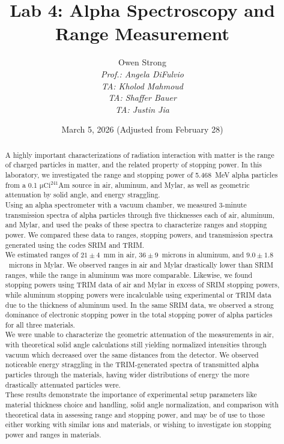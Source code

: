 \documentclass[12pt]{article}
\title{Lab 4: Alpha Spectroscopy and Range Measurement}
\author{Owen Strong \\
\itshape Prof.: Angela DiFulvio\\
\itshape TA: Kholod Mahmoud \\
\itshape TA: Shaffer Bauer \\
\itshape TA: Justin Jia \\
}
\date{March 5, 2026 (Adjusted from February 28)}
\newcommand{\micCi}{\xspace$\mathrm{\mu Ci}$\xspace}
\newcommand{\AmSrc}{\xspace$^{241}$Am\xspace}
\begin{document}
\maketitle
\pagebreak
{\hypersetup{linkcolor=black}\tableofcontents}
\begin{abstract}
A highly important characterizations of radiation interaction with matter is the range of charged particles in matter, and the related property of stopping power.
In this laboratory, we investigated the range and stopping power of 5.468~MeV alpha particles from a 0.1 \micCi \AmSrc source in air, aluminum, and Mylar, as well as geometric attenuation by solid angle, and energy straggling.\\

Using an alpha spectrometer with a vacuum chamber, we measured 3-minute transmission spectra of alpha particles through five thicknesses each of air, aluminum, and Mylar, and used the peaks of these spectra to characterize ranges and stopping power.
We compared these data to ranges, stopping powers, and transmission spectra generated using the codes SRIM and TRIM.\\

We estimated ranges of $21\pm4$~mm in air, $36\pm9$~microns in aluminum, and $9.0\pm1.8$~microns in Mylar.
We observed ranges in air and Mylar drastically lower than SRIM ranges, while the range in aluminum was more comparable.
Likewise, we found stopping powers using TRIM data of air and Mylar in excess of SRIM stopping powers, while aluminum stopping powers were incalculable using experimental or TRIM data due to the thickness of aluminum used.
In the same SRIM data, we observed a strong dominance of electronic stopping power in the total stopping power of alpha particles for all three materials.\\

We were unable to characterize the geometric attenuation of the measurements in air, with theoretical solid angle calculations still yielding normalized intensities through vacuum which decreased over the same distances from the detector.
We observed noticeable energy straggling in the TRIM-generated spectra of transmitted alpha particles through the materials, having wider distributions of energy the more drastically attenuated particles were.\\

These results demonstrate the importance of experimental setup parameters like material thickness choice and handling, solid angle normalization, and comparison with theoretical data in assessing range and stopping power, and may be of use to those either working with similar ions and materials, or wishing to investigate ion stopping power and ranges in materials.
\end{abstract}
\end{document}
